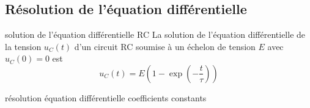 \documentclass[../main/main.tex]{subfiles}
\begin{document}
\subsection{Résolution de l'équation différentielle}
\begin{tcbraster}[raster columns=2, raster equal height=rows]
    \begin{tcolorbox}[blankest, raster multicolumn=1, space to=\myspace]
        \begin{tcbraster}[raster columns=1]
            \begin{prop}[label=prop:ucsolu]{solution de l'équation
                différentielle RC}
                La solution de l'équation différentielle de la tension $u_C(t)$
                d'un circuit RC soumise à un échelon de tension $E$ avec
                $u_C(0) = 0$ est
                \[\boxed{u_C(t) = E\left(1-\exp\left(-\frac{t}{\tau}\right)\right)}\]
            \end{prop}
            \begin{ror}[label=impo:eqres, heart]{résolution équation différentielle
                    coefficients constants}


\end{ror}
\end{tcbraster}
\end{tcolorbox}
\end{tcbraster}
\end{document}
